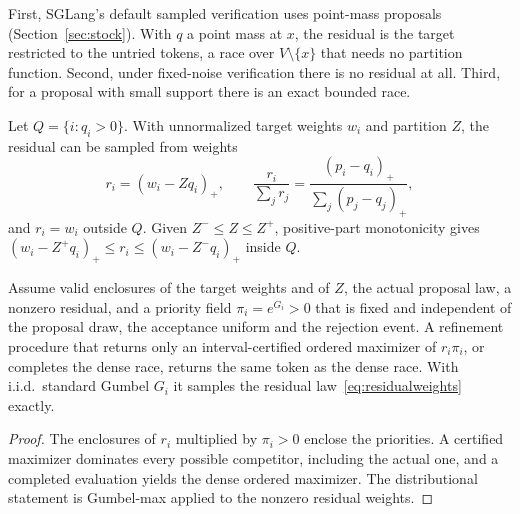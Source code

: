 First, SGLang's default sampled verification uses point-mass proposals (Section~\ref{sec:stock}). With $q$ a point mass at $x$, the residual is the target restricted to the untried tokens, a race over $V\setminus\{x\}$ that needs no partition function. Second, under fixed-noise verification there is no residual at all. Third, for a proposal with small support there is an exact bounded race.

Let $Q=\{i:q_i>0\}$. With unnormalized target weights $w_i$ and partition $Z$, the residual can be sampled from weights
\begin{equation}
r_i=(w_i-Zq_i)_+,\qquad\frac{r_i}{\sum_jr_j}=\frac{(p_i-q_i)_+}{\sum_j(p_j-q_j)_+},\label{eq:residualweights}
\end{equation}
and $r_i=w_i$ outside $Q$. Given $Z^-\le Z\le Z^+$, positive-part monotonicity gives $(w_i-Z^+q_i)_+\le r_i\le(w_i-Z^-q_i)_+$ inside $Q$.

\begin{theorem}\label{thm:residualrace}
Assume valid enclosures of the target weights and of $Z$, the actual proposal law, a nonzero residual, and a priority field $\pi_i=e^{G_i}>0$ that is fixed and independent of the proposal draw, the acceptance uniform and the rejection event. A refinement procedure that returns only an interval-certified ordered maximizer of $r_i\pi_i$, or completes the dense race, returns the same token as the dense race. With i.i.d.\ standard Gumbel $G_i$ it samples the residual law~\eqref{eq:residualweights} exactly.
\end{theorem}
\begin{proof}
The enclosures of $r_i$ multiplied by $\pi_i>0$ enclose the priorities. A certified maximizer dominates every possible competitor, including the actual one, and a completed evaluation yields the dense ordered maximizer. The distributional statement is Gumbel-max applied to the nonzero residual weights.
\end{proof}

